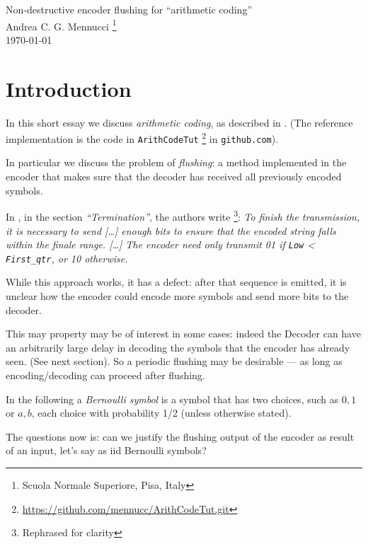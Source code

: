 \documentclass[a4paper,english]{article}
\begin{document}
\begin{center}\Large
  Non-destructive encoder flushing for ``arithmetic coding''\\
  Andrea C. G. Mennucci
  \footnote{Scuola Normale Superiore, Pisa, Italy}
  \\
  \today
\end{center}

\section{Introduction}

In this short essay we discuss \emph{arithmetic coding}, as described in
\cite{witten1987arithmetic}.
(The reference implementation is the code in \texttt{ArithCodeTut}
\footnote{\url{https://github.com/mennucc/ArithCodeTut.git}} in \texttt{github.com}).

In particular we discuss the problem of \emph{flushing}: a method implemented
in the encoder that makes sure that the decoder has received all previously
encoded symbols.

In \cite{witten1987arithmetic}, in the section \emph{``Termination''}, the authors write
\footnote{Rephrased for clarity}:
\emph{To finish the transmission, it is necessary to send
  [\ldots]  enough bits to ensure that the encoded string falls
  within the finale range. [\ldots] The encoder  need only transmit 01 if
\texttt{Low} < \texttt{First\_qtr}, or 10 otherwise.}



\smallskip

While this approach  works, it has a defect: after that sequence
is emitted, it is unclear how the encoder could encode more symbols
and send more bits to the decoder.


This may property may be of interest in some cases: indeed the Decoder
can have an arbitrarily large delay in decoding the symbols
that the encoder has already seen.
(See next section). So a periodic flushing may be desirable
--- as long as encoding/decoding can proceed after flushing.

\medskip

In the following a \emph{Bernoulli symbol} is a symbol that has two choices, such as $0,1$ or
$a,b$, each choice with probability 1/2 (unless otherwise stated).

\medskip

The questions now is: can we justify the flushing output of the
encoder as result of an input, let's say as iid Bernoulli symbols?
\end{document}

